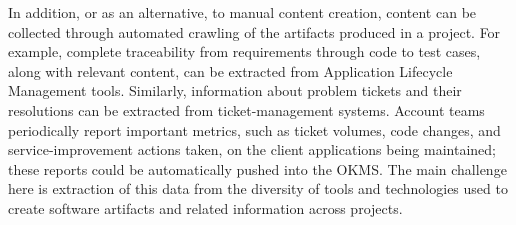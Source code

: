 
In addition, or as an alternative, to manual content creation, content can be
collected through automated crawling of the artifacts produced in a project. For
example, complete traceability from requirements through code to test cases,
along with relevant content, can be extracted from Application Lifecycle
Management tools. Similarly, information about problem tickets and their
resolutions can be extracted from ticket-management systems.  Account teams
periodically report important metrics, such as ticket volumes, code changes, and
service-improvement actions taken, on the client applications being maintained;
these reports could be automatically pushed into the OKMS. The main challenge
here is extraction of this data from the diversity of tools and technologies used to create software
artifacts and related information across projects.

